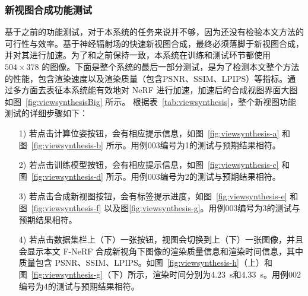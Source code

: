 \subsubsection{新视图合成功能测试}
基于之前的功能测试，对于本系统的任务来说并不够，因为还没有检验本文方法的可行性与效率。基于神经辐射场的快速新视图合成，最终必须落脚于新视图合成，并对其进行加速。为了和之前保持一致，本系统在训练和测试环节都使用 $504 \times 378$ 的图像。下面是整个系统的最后一部分测试，是为了检测本文整个方法的性能，包含渲染速度以及渲染质量（包含PSNR、SSIM、LPIPS）等指标。通过多方面去表征本系统能有效地对 NeRF 进行加速，加速后的合成视图界面大图如图~\ref{fig:viewsynthesisBig} 所示。
根据表~\ref{tab:viewsynthesis}，整个新视图功能测试的详细步骤如下：
\begin{enumerate}
	\item[1)] 若点击计算位姿按钮，会有相应提示信息，如图~\ref{fig:viewsynthesis-a} 和图~\ref{fig:viewsynthesis-b} 所示。用例003编号为1的测试与预期结果相符。
	\item[2)] 若点击训练模型按钮，会有相应提示信息，如图~\ref{fig:viewsynthesis-c} 和图~\ref{fig:viewsynthesis-d} 所示。用例003编号为2的测试与预期结果相符。
	\item[3)] 若点击合成新视图按钮，会有标签提示进度，如图~\ref{fig:viewsynthesis-e} 和图~\ref{fig:viewsynthesis-f} 以及图\ref{fig:viewsynthesis-g}。用例003编号为3的测试与预期结果相符。
	\item[4)] 若点击数据集栏上（下）一张按钮，视图会切换到上（下）一张图像，并且会显示本文 F-NeRF 合成新视角下图像的渲染质量信息和渲染时间信息，其中质量包含 PSNR、SSIM、LPIPS。如图~\ref{fig:viewsynthesis-h}（上）和图~\ref{fig:viewsynthesis-g}（下）所示，渲染时间分别为\SI{4.23}{s}和\SI{4.33}{s}。用例002编号为4的测试与预期结果相符。
\end{enumerate}



